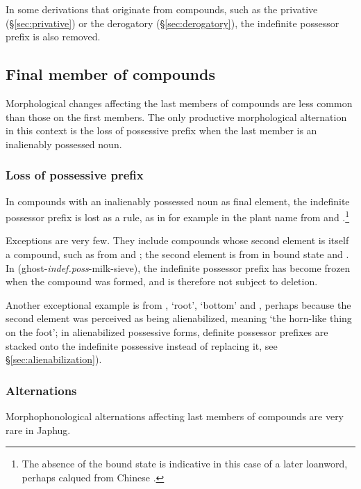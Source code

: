 In some derivations that originate from compounds, such as the privative (§\ref{sec:privative}) or the derogatory (§\ref{sec:derogatory}), the indefinite possessor prefix is also removed.

\subsection{Final member of compounds} \label{sec:final.compounds}
Morphological changes affecting the last members of compounds are less common than those on the first members. The only productive morphological alternation in this context is the loss of possessive prefix when the last member is an inalienably possessed noun.

\subsubsection{Loss of possessive prefix} \label{sec:possessive.prefix.second.compounds}
In compounds with an inalienably possessed noun as final element, the indefinite possessor prefix is lost as a rule, as in for example in the plant name \textit{} from  and .\footnote{The absence of the bound state  is indicative in this case of a later loanword, perhaps calqued from Chinese . }

Exceptions are very few. They include compounds whose second element is itself a compound, such as  from  and ; the second element is from  in bound state and . In  (ghost-\textit{indef.poss}-milk-sieve), the indefinite possessor prefix  has become frozen when the compound  was formed, and is therefore not subject to deletion.

Another exceptional example is  from , `root', `bottom' and , perhaps because the second element was perceived as being alienabilized, meaning `the horn-like thing on the foot'; in alienabilized possessive forms, definite possessor prefixes are stacked onto the indefinite possessive instead of replacing it, see §\ref{sec:alienabilization}).

\subsubsection{Alternations} \label{sec:second.member.alternation} 
Morphophonological alternations affecting last members of compounds are very rare in Japhug. 

